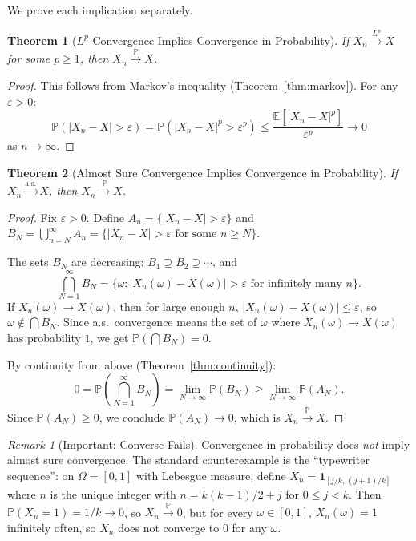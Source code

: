 \documentclass[11pt,a4paper]{article}
\theoremstyle{definition}
\theoremstyle{plain}
\newtheorem{theorem}{Theorem}[section]
\theoremstyle{remark}
\newtheorem{remark}{Remark}[section]
\newcommand{\E}{\mathbb{E}}
\newcommand{\Prob}{\mathbb{P}}
\newcommand{\indicator}{\mathbf{1}}
\newcommand{\cas}{\xrightarrow{\text{a.s.}}}
\newcommand{\cprob}{\xrightarrow{\Prob}}
\newcommand{\clp}[1]{\xrightarrow{L^{#1}}}
\begin{document}
We prove each implication separately.

\begin{theorem}[$L^p$ Convergence Implies Convergence in Probability]
\label{thm:lp_to_prob}
If $X_n \clp{p} X$ for some $p \geq 1$, then $X_n \cprob X$.
\end{theorem}

\begin{proof}
This follows from Markov's inequality (Theorem~\ref{thm:markov}). For any $\varepsilon > 0$:
\begin{equation}
    \Prob(|X_n - X| > \varepsilon) = \Prob(|X_n - X|^p > \varepsilon^p) \leq \frac{\E[|X_n - X|^p]}{\varepsilon^p} \to 0
    \label{eq:lp_to_prob_proof}
\end{equation}
as $n \to \infty$.
\end{proof}

\begin{theorem}[Almost Sure Convergence Implies Convergence in Probability]
\label{thm:as_to_prob}
If $X_n \cas X$, then $X_n \cprob X$.
\end{theorem}

\begin{proof}
Fix $\varepsilon > 0$. Define $A_n = \{|X_n - X| > \varepsilon\}$ and $B_N = \bigcup_{n=N}^\infty A_n = \{|X_n - X| > \varepsilon \text{ for some } n \geq N\}$.

The sets $B_N$ are decreasing: $B_1 \supseteq B_2 \supseteq \cdots$, and
\begin{equation}
    \bigcap_{N=1}^\infty B_N = \{\omega : |X_n(\omega) - X(\omega)| > \varepsilon \text{ for infinitely many } n\}.
\end{equation}
If $X_n(\omega) \to X(\omega)$, then for large enough $n$, $|X_n(\omega) - X(\omega)| \leq \varepsilon$, so $\omega \notin \bigcap B_N$. Since a.s.\ convergence means the set of $\omega$ where $X_n(\omega) \to X(\omega)$ has probability $1$, we get $\Prob(\bigcap B_N) = 0$.

By continuity from above (Theorem~\ref{thm:continuity}):
\begin{equation}
    0 = \Prob\!\left(\bigcap_{N=1}^\infty B_N\right) = \lim_{N \to \infty} \Prob(B_N) \geq \lim_{N \to \infty} \Prob(A_N).
\end{equation}
Since $\Prob(A_N) \geq 0$, we conclude $\Prob(A_N) \to 0$, which is $X_n \cprob X$.
\end{proof}

\begin{remark}[Important: Converse Fails]
\label{rem:conv_counterexample}
Convergence in probability does \emph{not} imply almost sure convergence. The standard counterexample is the ``typewriter sequence'': on $\Omega = [0,1]$ with Lebesgue measure, define $X_n = \indicator_{[j/k,\, (j+1)/k]}$ where $n$ is the unique integer with $n = k(k-1)/2 + j$ for $0 \leq j < k$. Then $\Prob(X_n = 1) = 1/k \to 0$, so $X_n \cprob 0$, but for every $\omega \in [0,1]$, $X_n(\omega) = 1$ infinitely often, so $X_n$ does not converge to $0$ for any $\omega$.
\end{remark}
\end{document}
